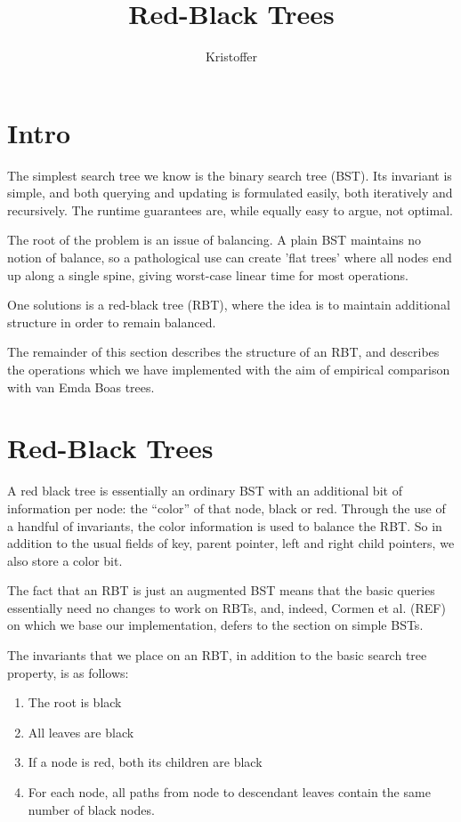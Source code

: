\documentclass[a4paper, 12pt]{article}
\title{Red-Black Trees}
\date{}
\author{Kristoffer}
\begin{document}
\maketitle
\section{Intro}
The simplest search tree we know is the binary search tree (BST). Its
invariant is simple, and both querying and updating is formulated
easily, both iteratively and recursively. The runtime guarantees are,
while equally easy to argue, not optimal.

The root of the problem is an issue of balancing. A plain BST
maintains no notion of balance, so a pathological use can create 'flat
trees' where all nodes end up along a single spine, giving worst-case
linear time for most operations.

One solutions is a red-black tree (RBT), where the idea is to maintain
additional structure in order to remain balanced.

The remainder of this section describes the structure of an RBT, and
describes the operations which we have implemented with the aim of
empirical comparison with van Emda Boas trees.

\section{Red-Black Trees}\label{sec:rbt}

A red black tree is essentially an ordinary BST with an additional bit
of information per node: the ``color'' of that node, black or
red. Through the use of a handful of invariants, the color information
is used to balance the RBT. So in addition to the usual fields of key,
parent pointer, left and right child pointers, we also store a color
bit.

The fact that an RBT is just an augmented BST means that the basic
queries essentially need no changes to work on RBTs, and, indeed,
Cormen et al. (REF) on which we base our implementation, defers to the
section on simple BSTs.

The invariants that we place on an RBT, in addition to the basic
search tree property, is as follows:

\begin{enumerate}
  \item The root is black
  \item All leaves are black
  \item If a node is red, both its children are black
  \item For each node, all paths from node to descendant leaves
    contain the same number of black nodes.
\end{enumerate}
\end{document}
